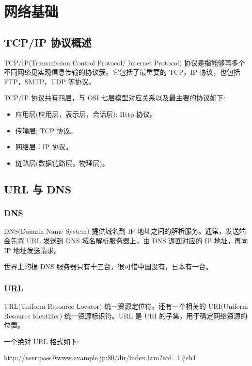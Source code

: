 \section{网络基础}

\subsection{TCP/IP 协议概述}

TCP/IP(Transmission Control Protocol/ Internet Protocol) 协议是指能够再多个不同网络见实现信息传输的协议簇。它包括了最重要的 TCP，IP 协议，也包括 FTP，SMTP，UDP 等协议。

TCP/IP 协议共有四层，与 OSI 七层模型对应关系以及最主要的协议如下:
\begin{itemize}
    \item 应用层(应用层，表示层，会话层): Http 协议。
    \item 传输层: TCP 协议。
    \item 网络层：IP 协议。
    \item 链路层(数据链路层，物理层)。
\end{itemize}

\subsection{URL 与 DNS}

\subsubsection*{DNS}

DNS(Domain Name System) 提供域名到 IP 地址之间的解析服务。通常，发送端会先将 URL 发送到 DNS 域名解析服务器上，由 DNS 返回对应的 IP 地址，再向 IP 地址发送请求。

世界上的根 DNS 服务器只有十三台，很可惜中国没有，日本有一台。

\subsubsection*{URL}

URL(Uniform Resource Locator) 统一资源定位符。还有一个相关的 URI(Uniform Resource Identifier) 统一资源标识符。URL 是 URI 的子集，用于确定网络资源的位置。

一个绝对 URL 格式如下:
\begin{center}
http://user:pass@www.example.jp:80/dir/index.htm?uid=1\#ch1
\end{center}

